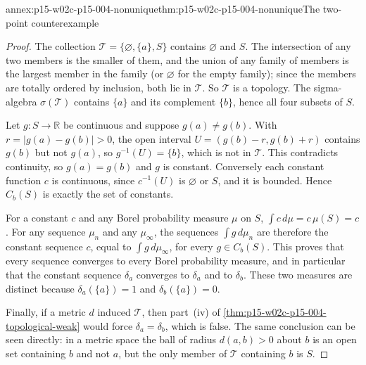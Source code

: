 \begin{annexitem}{annex:p15-w02c-p15-004-nonunique}{thm:p15-w02c-p15-004-nonunique}{The two-point counterexample}
\begin{proof}
The collection \(\mathcal T=\{\varnothing,\{a\},S\}\) contains
\(\varnothing\) and \(S\). The intersection of any two members is the
smaller of them, and the union of any family of members is the largest
member in the family (or \(\varnothing\) for the empty family); since
the members are totally ordered by inclusion, both lie in
\(\mathcal T\). So \(\mathcal T\) is a topology. The sigma-algebra
\(\sigma(\mathcal T)\) contains \(\{a\}\) and its complement \(\{b\}\),
hence all four subsets of \(S\).

Let \(g:S\to\mathbb R\) be continuous and suppose \(g(a)\neq g(b)\).
With \(r=|g(a)-g(b)|>0\), the open interval
\(U=(g(b)-r,g(b)+r)\) contains \(g(b)\) but not \(g(a)\), so
\(g^{-1}(U)=\{b\}\), which is not in \(\mathcal T\). This contradicts
continuity, so \(g(a)=g(b)\) and \(g\) is constant. Conversely each
constant function \(c\) is continuous, since \(c^{-1}(U)\) is
\(\varnothing\) or \(S\), and it is bounded. Hence \(C_b(S)\) is exactly
the set of constants.

For a constant \(c\) and any Borel probability measure \(\mu\) on \(S\),
\(\int c\,d\mu=c\,\mu(S)=c\). For any sequence \(\mu_n\) and any
\(\mu_\infty\), the sequences \(\int g\,d\mu_n\) are therefore the
constant sequence \(c\), equal to \(\int g\,d\mu_\infty\), for every
\(g\in C_b(S)\). This proves that every sequence converges to every
Borel probability measure, and in particular that the constant sequence
\(\delta_a\) converges to \(\delta_a\) and to \(\delta_b\). These two
measures are distinct because \(\delta_a(\{a\})=1\) and
\(\delta_b(\{a\})=0\).

Finally, if a metric \(d\) induced \(\mathcal T\), then part~(iv) of
\cref{thm:p15-w02c-p15-004-topological-weak} would force
\(\delta_a=\delta_b\), which is false. The same conclusion can be seen
directly: in a metric space the ball of radius \(d(a,b)>0\) about \(b\)
is an open set containing \(b\) and not \(a\), but the only member of
\(\mathcal T\) containing \(b\) is \(S\).
\end{proof}
\end{annexitem}

